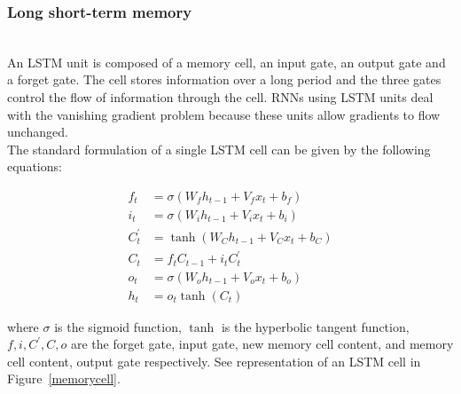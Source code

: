 
\subsubsection{Long short-term memory}~\\


An LSTM unit is composed of a memory cell, an input gate, an output gate and a
forget gate. The cell stores information over a long period and the three gates
control the flow of information through the cell. RNNs using LSTM units deal
with the vanishing gradient problem because these units allow gradients to flow
unchanged.\cite{doi:10.1162/neco.1997.9.8.1735}\\

The standard formulation of a single LSTM cell can be given by the following
equations:

\begin{align}
  f_t &= \sigma(W_f h_{t-1}+V_f x_t+b_f)\\
  i_t &= \sigma(W_i h_{t-1}+V_i x_t+b_i)\\
  C_t^{'} &= \tanh(W_C h_{t-1}+V_C x_t+b_C)\\
  C_t &= f_t C_{t-1}+i_t C_t^{'}\\
  o_t &= \sigma(W_o h_{t-1}+V_o x_t+b_o)\\
  h_t &= o_t \tanh(C_t)
\end{align}

where $\sigma$ is the sigmoid function, $\tanh$ is the hyperbolic tangent
function, $f,i,C^{'},C,o$ are the forget gate, input gate, new memory cell
content, and memory cell content, output gate respectively. See representation
of an LSTM cell in Figure~\ref{memorycell}.


